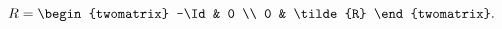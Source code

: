 \begin{equation}
\label{eq:stdR}
  R = \begin{twomatrix}
        -\Id &   0 \\
          0  & \tilde{R}
      \end{twomatrix}.
\end{equation}

